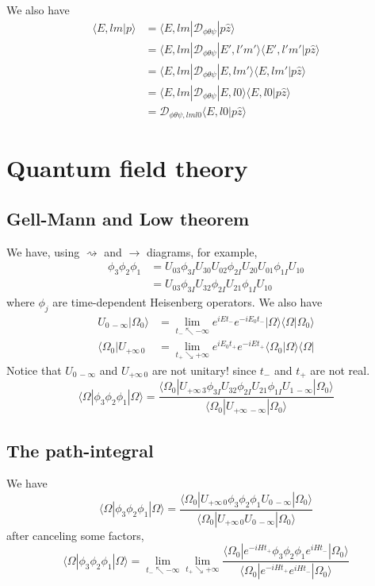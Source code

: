 \documentclass[12pt, oneside]{book}
\begin{document}
We also have
\begin{align*}
\langle E,lm|p\rangle
&=\langle E,lm|\mathcal{D}_{\phi\theta\psi}|p\hat{z}\rangle\\
&=\langle E,lm|\mathcal{D}_{\phi\theta\psi}|E',l'm'\rangle\langle E',l'm'|p\hat{z}\rangle\\
&=\langle E,lm|\mathcal{D}_{\phi\theta\psi}|E,lm'\rangle\langle E,lm'|p\hat{z}\rangle\\
&=\langle E,lm|\mathcal{D}_{\phi\theta\psi}|E,l0\rangle\langle E,l0|p\hat{z}\rangle\\
&=\mathcal{D}_{\phi\theta\psi,lml0}\langle E,l0|p\hat{z}\rangle
\end{align*}

\chapter{Quantum field theory}
\section*{Gell-Mann and Low theorem}
We have, using $\rightsquigarrow$ and $\rightarrow$ diagrams, for example,
\begin{align*}
\phi_3\phi_2\phi_1
&=U_{03}\phi_{3I}U_{30}U_{02}\phi_{2I}U_{20}U_{01}\phi_{1I}U_{10}\\
&=U_{03}\phi_{3I}U_{32}\phi_{2I}U_{21}\phi_{1I}U_{10}
\end{align*}
where $\phi_j$ are time-dependent Heisenberg operators. We also have
\begin{align*}
U_{0\,-\infty}|\Omega_0\rangle&=\lim_{t_-\nwarrow-\infty}e^{iEt_-}e^{-iE_0t_-}|\Omega\rangle\langle\Omega|\Omega_0\rangle\\
\langle\Omega_0|U_{+\infty\,0}&=\lim_{t_+\searrow+\infty}e^{iE_0t_+}e^{-iEt_+}\langle\Omega_0|\Omega\rangle\langle\Omega|
\end{align*}
Notice that $U_{0\,-\infty}$ and $U_{+\infty\,0}$ are not unitary! since $t_-$ and $t_+$ are not real.
\[
\langle\Omega|\phi_3\phi_2\phi_1|\Omega\rangle=\frac{\langle\Omega_0|U_{+\infty\,3}\phi_{3I}U_{32}\phi_{2I}U_{21}\phi_{1I}U_{1\,-\infty}|\Omega_0\rangle}{\langle\Omega_0|U_{+\infty\,-\infty}|\Omega_0\rangle}
\]

\section*{The path-integral}
We have
\[
\langle\Omega|\phi_3\phi_2\phi_1|\Omega\rangle=\frac{\langle\Omega_0|U_{+\infty\,0}\phi_3\phi_2\phi_1U_{0\,-\infty}|\Omega_0\rangle}{\langle\Omega_0|U_{+\infty\,0}U_{0\,-\infty}|\Omega_0\rangle}
\]
after canceling some factors,
\[
\langle\Omega|\phi_3\phi_2\phi_1|\Omega\rangle=\lim_{t_-\nwarrow-\infty}\lim_{t_+\searrow+\infty}\frac{\langle\Omega_0|e^{-iHt_+}\phi_3\phi_2\phi_1e^{iHt_-}|\Omega_0\rangle}{\langle\Omega_0|e^{-iHt_+}e^{iHt_-}|\Omega_0\rangle}
\]
\end{document}
